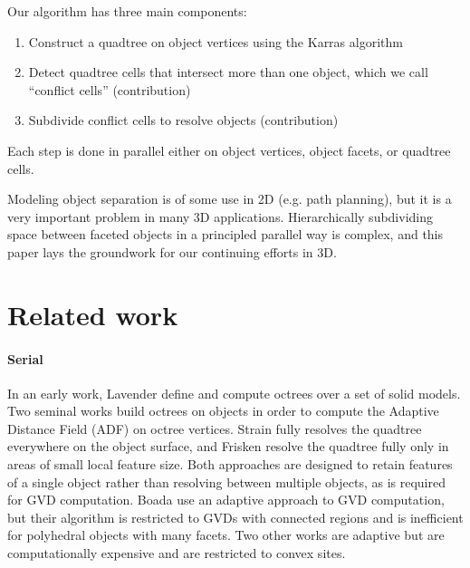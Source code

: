 \documentclass[final,3p,times,twocolumn]{elsarticle}
\begin{document}
Our algorithm has three main components:

\begin{enumerate}
\item Construct a quadtree on object vertices using the Karras algorithm \cite{karras2012maximizing}
\item Detect quadtree cells that intersect more than one object, which we call ``conflict cells'' (contribution)
\item Subdivide conflict cells to resolve objects (contribution)
\end{enumerate}

Each step is done in parallel either on object vertices, object facets, or quadtree cells.

Modeling object separation is of some use in 2D (e.g. path planning), but it is a very important problem in many 3D applications. Hierarchically subdividing space between faceted objects in a principled parallel way is complex, and this paper lays the groundwork for our continuing efforts in 3D.

\section{Related work}

\paragraph{Serial} In an early work, Lavender \etal {} define and compute octrees over a set of solid models. 
Two seminal works build octrees on objects in order to compute the Adaptive Distance Field (ADF) on octree vertices.  Strain  fully resolves the quadtree everywhere on the object surface, and Frisken \etal {} resolve the quadtree fully only in areas of small local feature size.  Both approaches are designed to retain features of a single object rather than resolving between multiple objects, as is required for GVD computation. Boada \etal {} use an adaptive approach to GVD computation, but their algorithm is restricted to GVDs with connected regions and is inefficient for polyhedral objects with many facets.  Two other works are adaptive \cite{teichmann1997polygonal,vleugels1998approximating} but are computationally expensive and are restricted to convex sites.
\end{document}
